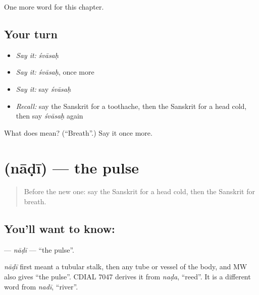 \begin{grammarlens}[title={What you've built}]
One more word for this chapter.
\end{grammarlens}

\subsection*{Your turn}
\begin{itemize}
\raggedright
  \item \emph{Say it:} \emph{śvāsaḥ}
  \item \emph{Say it:} \emph{śvāsaḥ}, once more
  \item \emph{Say it:} say \emph{śvāsaḥ}
  \item \emph{Recall:} say the Sanskrit for a toothache, then the Sanskrit for a head cold, then say \emph{śvāsaḥ} again
\end{itemize}

\begin{tcolorbox}[breakable,colback=teal!4,colframe=teal!35!black,title={Before you move on}]
What does  mean? (\textquotedblleft{}Breath\textquotedblright{}.) Say it once more.
\end{tcolorbox}
\section[\texorpdfstring{\sk{नाडी} (nāḍī)}{नाडी (nāḍī)}]{ (nāḍī) — the pulse}

\label{lesson:SA-C181-nadi}



\begin{quote}
Before the new one: say the Sanskrit for a head cold, then the Sanskrit for breath.
\end{quote}

\subsection*{You'll want to know: }
\textbf{} — \emph{nāḍī} — \textquotedblleft{}the pulse\textquotedblright{}.

\begin{cousinweb}
\emph{nāḍī} first meant a tubular stalk, then any tube or vessel of the body, and MW also gives \textquotedblleft{}the pulse\textquotedblright{}. CDIAL 7047 derives it from \emph{naḍa}, \textquotedblleft{}reed\textquotedblright{}. It is a different word from \emph{nadī}, \textquotedblleft{}river\textquotedblright{}.
\end{cousinweb}


